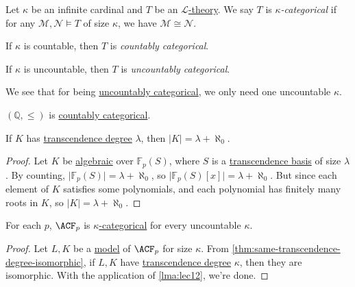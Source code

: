 \begin{definition}[Categorical]\label{def:categorical}
	Let \(\kappa \) be an infinite cardinal and \(T\) be an \hyperref[def:theory]{\(\mathcal{L} \)-theory}. We say \(T\) is \emph{\(\kappa \)-categorical} if for any \(\mathcal{M} , \mathcal{N} \models T\) of size \(\kappa \), we have \(\mathcal{M} \cong \mathcal{N} \).

	\begin{definition}\label{def:countably-categorical}
		If \(\kappa \) is countable, then \(T\) is \emph{countably categorical}.
	\end{definition}
	\begin{definition}\label{def:uncountably-categorical}
		If \(\kappa \) is uncountable, then \(T\) is \emph{uncountably categorical}.
	\end{definition}
\end{definition}

We see that for being \hyperref[def:uncountably-categorical]{uncountably categorical}, we only need one uncountable \(\kappa \).

\begin{eg}
	\((\mathbb{Q} , \leq )\) is \hyperref[def:countably-categorical]{countably categorical}.
\end{eg}

\begin{lemma}\label{lma:lec12}
	If \(K\) has \hyperref[def:transcendence-degree]{transcendence degree} \(\lambda \), then \(\vert K \vert = \lambda + \aleph_0\).
\end{lemma}
\begin{proof}
	Let \(K\) be \hyperref[def:algebraic-extension]{algebraic} over \(\mathbb{F} _p(S)\), where \(S\) is a \hyperref[def:transcendence-basis]{transcendence basis} of size \(\lambda \). By counting, \(\vert \mathbb{F} _p(S) \vert = \lambda + \aleph_0\), so \(\vert \mathbb{F} _p(S)[x] \vert = \lambda + \aleph_0\). But since each element of \(K\) satisfies some polynomials, and each polynomial has finitely many roots in \(K\), so \(\vert K \vert = \lambda +\aleph_0\).
\end{proof}

\begin{theorem}\label{thm:ACF-categorical}
	For each \(p\), \(\ACF_p \) is \hyperref[def:categorical]{\(\kappa \)-categorical} for every uncountable \(\kappa \).
\end{theorem}
\begin{proof}
	Let \(L, K\) be a \hyperref[def:model]{model} of \(\ACF_p \) for size \(\kappa \). From \autoref{thm:same-transcendence-degree-isomorphic}, if \(L, K\) have \hyperref[def:transcendence-degree]{transcendence degree} \(\kappa \), then they are isomorphic. With the application of \autoref{lma:lec12}, we're done.
\end{proof}


